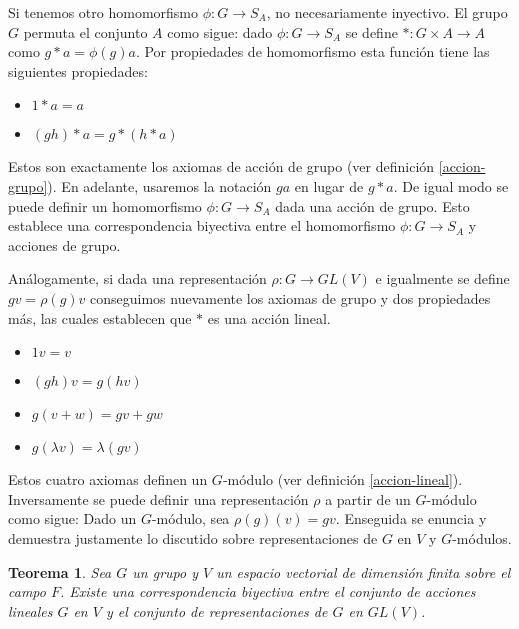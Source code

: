 \documentclass[12pt]{book}
\newtheorem{theorem}{Teorema}[section]
\theoremstyle{definition}
\newcounter{in}
\newcounter{ini}
\begin{document}
Si tenemos otro homomorfismo $\phi:G\rightarrow S_{A}$, no
necesariamente inyectivo. El grupo $G$ permuta el conjunto $A$ como sigue: dado
$\phi:G\rightarrow S_{A}$ se define $*:G\times A\rightarrow A$ como
$g*a=\phi(g)a$. Por propiedades de homomorfismo esta función tiene las
siguientes propiedades:
\begin{itemize}
\item $1*a=a$
\item $(gh)*a=g*(h*a)$
\end{itemize}

Estos son exactamente los axiomas de
acción de grupo (ver definición \ref{accion-grupo}). En adelante,
usaremos la notación $ga$ en lugar de $g*a$. De igual modo se puede
definir un homomorfismo $\phi:G\rightarrow S_{A}$ dada una acción de grupo. Esto establece una
correspondencia biyectiva entre el homomorfismo $\phi:G\rightarrow
S_{A}$ y acciones de grupo.

Análogamente, si dada una representación $\rho:G\rightarrow GL(V)$ e igualmente se define
$gv=\rho(g)v$ conseguimos nuevamente los axiomas de grupo y dos
propiedades más, las cuales establecen que $*$ es una acción lineal.
\begin{itemize}
\item $1v=v$
\item $(gh)v=g(hv)$
\item $g(v+w)=gv+gw$
\item $g(\lambda v)=\lambda(gv)$
\end{itemize}

Estos cuatro axiomas definen un $G$-módulo (ver definición
\ref{accion-lineal}). Inversamente se puede definir una representación
$\rho$ a partir de un $G$-módulo como sigue:
Dado un $G$-módulo, sea $\rho(g)(v)=gv$. Enseguida se
enuncia y demuestra justamente lo
discutido sobre representaciones de
$G$ en $V$ y $G$-módulos.

\begin{theorem}
  \label{rep-mod}
  Sea $G$ un grupo y $V$ un espacio vectorial de dimensión finita
  sobre el campo $F$. Existe una correspondencia biyectiva entre el conjunto de acciones
  lineales $G$ en $V$ y el conjunto de representaciones de $G$ en $GL(V)$.
\end{theorem}
\end{document}
